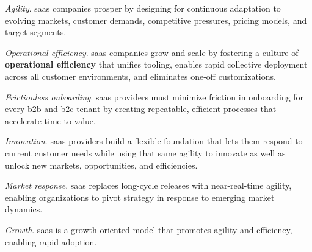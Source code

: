 \documentclass[11pt, a4paper, oneside, listof=totoc]{scrartcl}
\begin{document}
            \begin{enumerate}[label={[\arabic*]:},
                    ref=Challenge~\arabic*,
                    leftmargin=*,
                    itemsep=0.6\baselineskip]

                    \item\label{chal:saasAgility}
                        \textit{Agility}.
                        \gls{saas} companies prosper by designing for continuous adaptation to
                        evolving markets, customer demands, competitive pressures, pricing models,
                        and target segments.

                    \item\label{chal:saasOperationalEfficiency}
                        \textit{Operational efficiency}.
                        \gls{saas} companies grow and scale by fostering a culture of
                        \textbf{operational efficiency} that unifies tooling, enables rapid
                        collective deployment across all customer environments, and eliminates
                        one-off customizations.

                    \item\label{chal:saasFrictionlessOnboarding}
                        \textit{Frictionless onboarding}.
                        \gls{saas} providers must minimize friction in onboarding for every
                        \gls{b2b} and \gls{b2c} tenant by creating repeatable, efficient processes
                        that accelerate time-to-value.

                    \item\label{chal:saasInnovation}
                        \textit{Innovation}.
                        \gls{saas} providers build a flexible foundation that lets them respond to
                        current customer needs while using that same agility to innovate as well as
                        unlock new markets, opportunities, and efficiencies.

                    \item\label{chal:saasMarketResponse}
                        \textit{Market response}.
                        \gls{saas} replaces long-cycle releases with near-real-time agility,
                        enabling organizations to pivot strategy in response to emerging market
                        dynamics.

                    \item\label{chal:saasGrowth}
                        \textit{Growth}.
                        \gls{saas} is a growth-oriented model that promotes agility and efficiency,
                        enabling rapid adoption.

            \end{enumerate}
\end{document}
